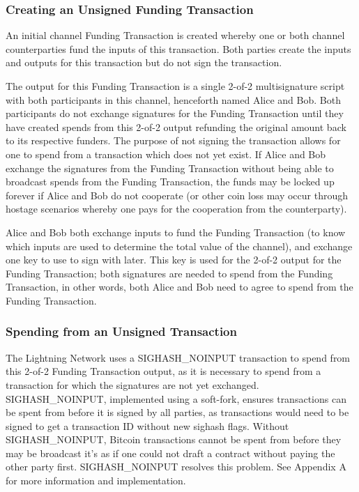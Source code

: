 \documentclass[letterpaper,11pt]{article}
\begin{document}
\subsubsection{Creating an Unsigned Funding Transaction}

An initial channel Funding Transaction is created whereby one or both channel
counterparties fund the inputs of this transaction. Both parties create the
inputs and outputs for this transaction but do not sign the transaction.

The output for this Funding Transaction is a single 2-of-2 multisignature script
with both participants in this channel, henceforth named Alice and Bob. Both
participants do not exchange signatures for the Funding Transaction until they
have created spends from this 2-of-2 output refunding the original amount back
to its respective funders. The purpose of not signing the transaction allows for
one to spend from a transaction which does not yet exist. If Alice and Bob
exchange the signatures from the Funding Transaction without being able to
broadcast spends from the Funding Transaction, the funds may be locked up
forever if Alice and Bob do not cooperate (or other coin loss may occur through
hostage scenarios whereby one pays for the cooperation from the counterparty).

Alice and Bob both exchange inputs to fund the Funding Transaction (to know
which inputs are used to determine the total value of the channel), and exchange
one key to use to sign with later. This key is used for the 2-of-2 output for
the Funding Transaction; both signatures are needed to spend from the Funding
Transaction, in other words, both Alice and Bob need to agree to spend from the
Funding Transaction.

\subsubsection{Spending from an Unsigned Transaction}

The Lightning Network uses a SIGHASH\_NOINPUT transaction to spend from this
2-of-2 Funding Transaction output, as it is necessary to spend from a
transaction for which the signatures are not yet exchanged. SIGHASH\_NOINPUT,
implemented using a soft-fork, ensures transactions can be spent from before it
is signed by all parties, as transactions would need to be signed to get a
transaction ID without new sighash flags. Without SIGHASH\_NOINPUT, Bitcoin
transactions cannot be spent from before they may be broadcast \textemdash it's
as if one could not draft a contract without paying the other party first.
SIGHASH\_NOINPUT resolves this problem. See Appendix A for more information and
implementation.
\end{document}
